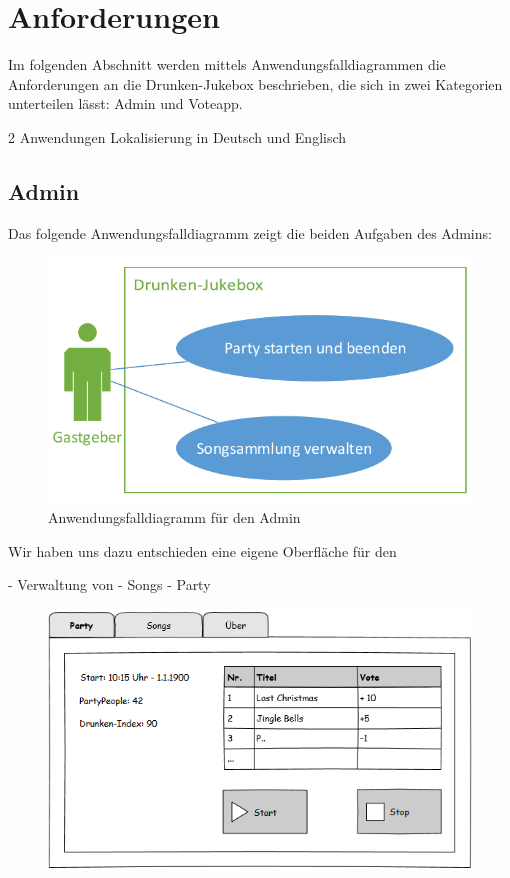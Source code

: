 \section{Anforderungen}
Im folgenden Abschnitt werden mittels Anwendungsfalldiagrammen die Anforderungen an die Drunken-Jukebox beschrieben, die sich in zwei Kategorien unterteilen lässt: Admin und Voteapp.

2 Anwendungen
Lokalisierung in Deutsch und Englisch


\subsection{Admin}
Das folgende Anwendungsfalldiagramm zeigt die beiden Aufgaben des Admins:

\begin{figure}[H]
\centering
\includegraphics[width=0.7\linewidth]{Bilder/AdminUseCase}
\caption{Anwendungsfalldiagramm für den Admin}
\label{fig:AdminUseCase}
\end{figure}

Wir haben uns dazu entschieden eine eigene Oberfläche für den 



- Verwaltung von
  - Songs
  - Party
  
\begin{figure}[H]
\centering
\includegraphics[width=0.95\linewidth]{Bilder/MockParty}
\caption{}
\label{fig:MockParty}
\end{figure}

